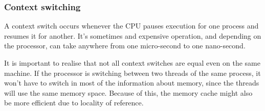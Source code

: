 \subsubsection{Context switching}

A context switch occurs whenever the CPU pauses execution for one process and
resumes it for another. It's sometimes and expensive operation, and depending on
the processor, can take anywhere from one micro-second to one nano-second.


It is important to realise that not all context switches are equal even on the
same machine. If the processor is switching between two threads of the same
process, it won't have to switch in most of the information about memory, since
the threads will use the same memory space. Because of this, the memory cache
might also be more efficient due to locality of reference.
